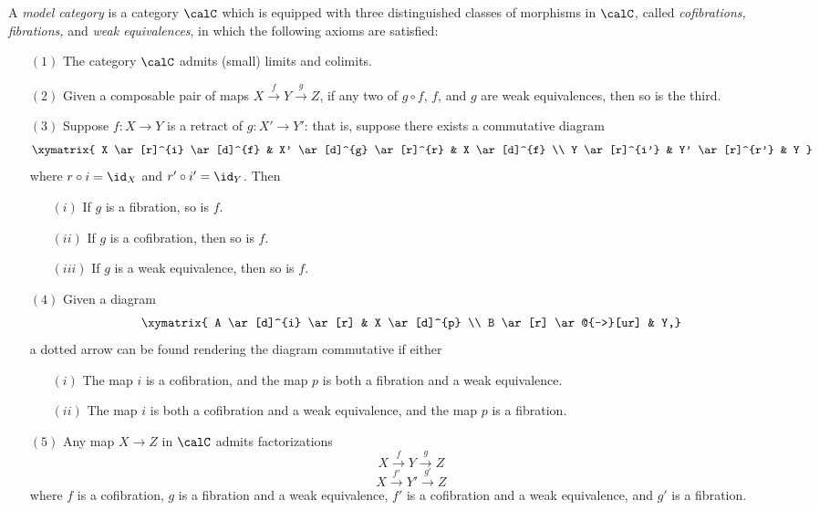 \begin{definition}\label{modelcatdef}
A {\it model category} is a category $\calC$ which is equipped with three distinguished classes of morphisms in $\calC$, called {\it cofibrations, fibrations,} and {\it weak equivalences}, in which the following axioms are satisfied:
\begin{itemize}
\item[$(1)$] The category $\calC$ admits (small) limits and colimits.
\item[$(2)$] Given a composable pair of maps $X \stackrel{f}{\rightarrow} Y \stackrel{g}{\rightarrow} Z$, if any two of $g \circ f$, $f$, and $g$ are weak equivalences, then so is the third.
\item[$(3)$] Suppose $f: X \rightarrow Y$ is a retract of $g: X' \rightarrow Y'$: that is, suppose
there exists a commutative diagram
$$ \xymatrix{ X \ar[r]^{i} \ar[d]^{f} & X' \ar[d]^{g} \ar[r]^{r} & X \ar[d]^{f} \\
Y \ar[r]^{i'} & Y' \ar[r]^{r'} & Y } $$
where $r \circ i = \id_X$ and $r' \circ i' = \id_Y$. Then
\begin{itemize}
\item[$(i)$] If $g$ is a fibration, so is $f$.
\item[$(ii)$] If $g$ is a cofibration, then so is $f$.
\item[$(iii)$] If $g$ is a weak equivalence, then so is $f$.
\end{itemize}

\item[$(4)$] Given a diagram
$$ \xymatrix{ A \ar[d]^{i} \ar[r] & X \ar[d]^{p} \\
B \ar[r] \ar@{-->}[ur] & Y,}$$
a dotted arrow can be found rendering the diagram commutative if either
\begin{itemize}
\item[$(i)$] The map $i$ is a cofibration, and the map $p$ is both a fibration and a weak equivalence.
\item[$(ii)$] The map $i$ is both a cofibration and a weak equivalence, and the map $p$ is a fibration.
\end{itemize}
\item[$(5)$] Any map $X \rightarrow Z$ in $\calC$ admits factorizations
$$ X \stackrel{f}{\rightarrow} Y \stackrel{g}{\rightarrow} Z$$
$$ X \stackrel{f'}{\rightarrow} Y' \stackrel{g'}{\rightarrow} Z$$
where $f$ is a cofibration, $g$ is a fibration and a weak equivalence, $f'$ is a cofibration and a weak equivalence, and $g'$ is a fibration.
\end{itemize}
\end{definition}

